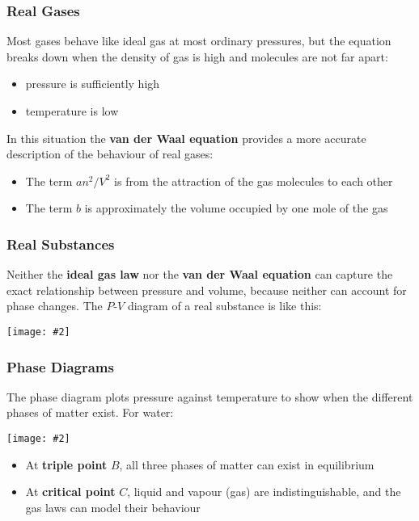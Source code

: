 \documentclass[12pt,aspectratio=169]{beamer}
\newcommand{\pic}[2]{\texttt{[image: \#2]}}
\newcommand{\eq}[2]{\vspace{#1}{\Large\begin{displaymath}#2\end{displaymath}}}
\begin{document}
\begin{frame}
  \frametitle{Real Gases}
  Most gases behave like ideal gas at most ordinary pressures, but the
  equation breaks down when the density of gas is high and molecules are not
  far apart:
  \begin{itemize}
  \item pressure is sufficiently high
  \item temperature is low
  \end{itemize}
  In this situation the \textbf{van der Waal equation} provides a more accurate
  description of the behaviour of real gases:

  \eq{-.2in}{
    \boxed{\left(P+\frac{an^2}{V^2}\right)(V-bn)=nRT}
  }

  \begin{itemize}
  \item The term $an^2/V^2$ is from the attraction of the gas molecules to each
    other
  \item The term $b$ is approximately the volume occupied by one mole of the gas
  \end{itemize}
\end{frame}




\begin{frame}
  \frametitle{Real Substances}
  Neither the \textbf{ideal gas law} nor the \textbf{van der Waal equation}
  can capture the exact relationship between pressure and volume, because
  neither can account for phase changes. The $P$-$V$ diagram of a real substance
  is like this:
  \begin{center}
    \pic{.35}{realsubstance.png}
  \end{center}
\end{frame}


\begin{frame}
  \frametitle{Phase Diagrams}
  The phase diagram plots pressure against temperature to show when the
  different phases of matter exist. For water:
  \begin{center}
    \vspace{-.1in}
    \pic{.4}{10-figure-31.png}
  \end{center}
  \begin{itemize}
  \item\vspace{-.15in} At \textbf{triple point} $B$, all three phases of matter
    can exist in equilibrium
  \item At \textbf{critical point} $C$, liquid and vapour (gas) are
    indistinguishable, and the gas laws can model their behaviour
  \end{itemize}
\end{frame}
\end{document}
